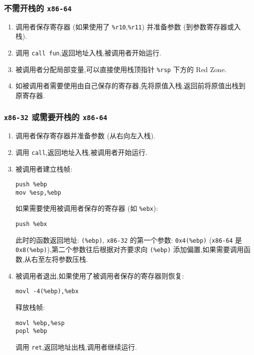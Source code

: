             \subsubsection{不需开栈的 \texttt{x86-64}}
                \begin{enumerate}
                    \item 调用者保存寄存器 (如果使用了 \texttt{\%r10},\texttt{\%r11}) 并准备参数 (到参数寄存器或入栈).
                    \item 调用 \texttt{call fun},返回地址入栈,被调用者开始运行.
                    \item 被调用者分配局部变量,可以直接使用栈顶指针 \texttt{\%rsp} 下方的 Red Zone.
                    \item 如被调用者需要使用由自己保存的寄存器,先将原值入栈,返回前将原值出栈到原寄存器.
                \end{enumerate}
            \subsubsection{\texttt{x86-32} 或需要开栈的 \texttt{x86-64}}
                \begin{enumerate}
                    \item 调用者保存寄存器并准备参数 (从右向左入栈).
                    \item 调用 \texttt{call},返回地址入栈,被调用者开始运行.
                    \item 被调用者建立栈帧:

                        \texttt{push \%ebp\\mov \%esp,\%ebp}

                        如果需要使用被调用者保存的寄存器 (如 \texttt{\%ebx}):

                        \texttt{push \%ebx}

                        此时的函数返回地址: \texttt{(\%ebp)}, \texttt{x86-32} 的第一个参数: \texttt{0x4(\%ebp)} (\texttt{x86-64} 是 \texttt{0x8(\%ebp)}),第二个参数往后根据对齐要求向 \texttt{(\%ebp)} 添加偏置,如果需要调用函数,从右至左将参数压栈.
                    \item 被调用者退出,如果使用了被调用者保存的寄存器则恢复:

                        \texttt{movl -4(\%ebp),\%ebx}

                        释放栈帧:

                        \texttt{movl \%ebp,\%esp\\popl \%ebp}

                        调用 \texttt{ret},返回地址出栈,调用者继续运行.
                \end{enumerate}
